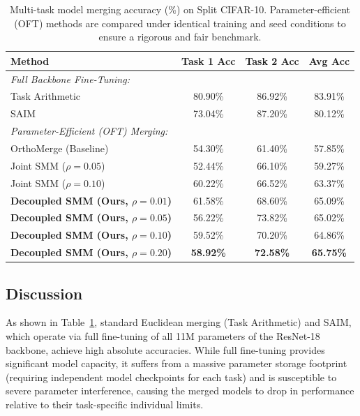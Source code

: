 \documentclass{article}
\theoremstyle{plain}
\theoremstyle{definition}
\theoremstyle{remark}
\begin{document}
\begin{table}[t]
\caption{Multi-task model merging accuracy (\%) on Split CIFAR-10. Parameter-efficient (OFT) methods are compared under identical training and seed conditions to ensure a rigorous and fair benchmark.}
\label{tab:results}
\vskip 0.15in
\begin{center}
\begin{small}
\begin{sc}
\begin{tabular}{lccc}
\toprule
Method & Task 1 Acc & Task 2 Acc & Avg Acc \\
\midrule
\textit{Full Backbone Fine-Tuning:} & & & \\
Task Arithmetic & 80.90\% & 86.92\% & 83.91\% \\
SAIM & 73.04\% & 87.20\% & 80.12\% \\
\midrule
\textit{Parameter-Efficient (OFT) Merging:} & & & \\
OrthoMerge (Baseline) & 54.30\% & 61.40\% & 57.85\% \\
Joint SMM ($\rho = 0.05$) & 52.44\% & 66.10\% & 59.27\% \\
Joint SMM ($\rho = 0.10$) & 60.22\% & 66.52\% & 63.37\% \\
\bf Decoupled SMM (Ours, $\rho = 0.01$) & 61.58\% & 68.60\% & 65.09\% \\
\bf Decoupled SMM (Ours, $\rho = 0.05$) & 56.22\% & 73.82\% & 65.02\% \\
\bf Decoupled SMM (Ours, $\rho = 0.10$) & 59.52\% & 70.20\% & 64.86\% \\
\bf Decoupled SMM (Ours, $\rho = 0.20$) & \bf 58.92\% & \bf 72.58\% & \bf 65.75\% \\
\bottomrule
\end{tabular}
\end{sc}
\end{small}
\end{center}
\vskip -0.1in
\end{table}

\subsection{Discussion}
As shown in Table~\ref{tab:results}, standard Euclidean merging (Task Arithmetic) and SAIM, which operate via full fine-tuning of all 11M parameters of the ResNet-18 backbone, achieve high absolute accuracies. While full fine-tuning provides significant model capacity, it suffers from a massive parameter storage footprint (requiring independent model checkpoints for each task) and is susceptible to severe parameter interference, causing the merged models to drop in performance relative to their task-specific individual limits.
\end{document}
